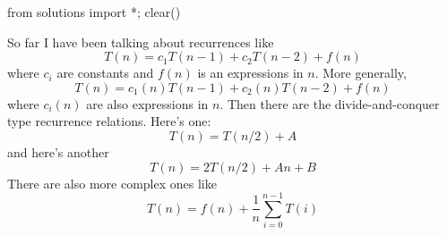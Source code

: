 \begin{python0}
from solutions import *; clear()
\end{python0}

So far I have been talking about recurrences like
\[
T(n) = c_1 T(n-1) + c_2 T(n-2) + f(n)
\]
where $c_i$ are constants and $f(n)$ is an expressions in $n$.
More generally,
\[
T(n) = c_1(n) T(n-1) + c_2(n) T(n-2) + f(n)
\]
where $c_i(n)$ are also expressions in $n$.
Then there are the divide-and-conquer type recurrence relations.
Here's one:
\[
T(n) = T(n/2) + A
\]
and here's another
\[
T(n) = 2T(n/2) + An + B
\]
There are also more complex ones like
\[
T(n) = f(n) + \frac{1}{n} \sum_{i=0}^{n-1} T(i)
\]

\begin{comment}
\newpage
\begin{ex}
  \begin{tightlist}
    \item
    Let
    \[
    T(n) = T(\floor{n/2}) + 1
    \]
    and $T(n) = 1$ if $n \leq 1$.
    Compute (by hand) and
    write down the table for $T(n)$ for $n = 0, 1, 2, ..., 9$.
    \item
    Let
    \[
    T'(n) = T'(\ceiling{n/2}) + 1
    \]
    and $T'(n) = 1$ if $n \leq 1$.
    Write down the table for $T'(n)$ for $n = 0, 1, 2, ..., 9$.
  \end{tightlist}
  Compute more values for $T(n)$ and $T'(n)$ ... as in \textit{lots} of $n$'s
  and plot them.
  Compare $T(n)$ and $T'(n)$ when $n$ is large.
  Can you find good approximation for $T(n)$ and $T'(n)$?
  (Here good mean functions such as $n^\alpha$, $\lg^\alpha n$,
  $n^\alpha \lg^\beta n$, $c^n$, etc.
  You'll see that asymptotically (when $n$ is large),
  $T(n)$ and $T'(n)$ are about the same.
  \qed
\end{ex}


\newpage
\begin{ex}
  \begin{tightlist}
    \item
    Let
    \[
    T(n) = 2 T(\floor{n/2}) + 1
    \]
    and $T(n) = 1$ if $n \leq 1$.
    Compute (by hand) and
    write down the table for $T(n)$ for $n = 0, 1, 2, ..., 9$.
    \item
    Let
    \[
    T'(n) = T'(\floor{n/2}) + T'(\ceiling{n/2}) + 1
    \]
    and $T'(n) = 1$ if $n \leq 1$.
    Write down the table for $T'(n)$ for $n = 0, 1, 2, ..., 9$.
  \end{tightlist}
  Plot more values for $T(n)$ and $T'(n)$ ... as in \textit{lots} of $n$'s.
  Compare $T(n)$ and $T'(n)$ when $n$ is large.
  Can you find good approximation for $T(n)$ and $T'(n)$?
  (Here good mean functions such as $n^\alpha$, $\lg^\alpha n$,
  $n^\alpha \lg^\beta n$, $c^n$, etc.
  You'll see that asymptotically (when $n$ is large),
  $T(n)$ and $T'(n)$ are about the same.
  \qed
\end{ex}



\end{comment}
